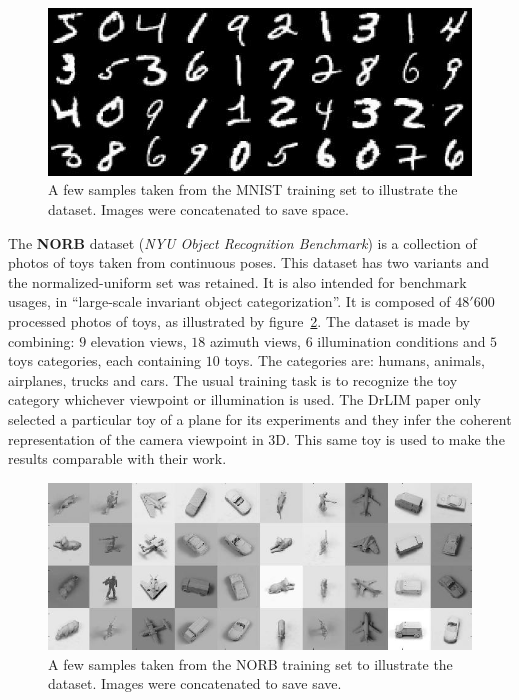 \documentclass[a4paper,12pt]{report}
\begin{document}
\begin{figure}[t]
    \begin{center}
        \includegraphics{thesis_figures/mnist.jpg}
    \end{center}
    \caption{A few samples taken from the MNIST training set to illustrate the dataset. Images were concatenated to save space.}
    \label{fig:mnist}
\end{figure}

The {\bf NORB} dataset ({\em NYU Object Recognition Benchmark}) is a collection of photos of toys taken from continuous poses.
This dataset has two variants and the normalized-uniform set was retained.
It is also intended for benchmark usages, in ``large-scale invariant object categorization''.
It is composed of $48'600$ processed photos of toys, as illustrated by figure~\ref{fig:norb}.
The dataset is made by combining: $9$ elevation views, $18$ azimuth views, $6$ illumination conditions and $5$ toys categories, each containing $10$ toys.
The categories are: humans, animals, airplanes, trucks and cars.
The usual training task is to recognize the toy category whichever viewpoint or illumination is used.
The DrLIM paper only selected a particular toy of a plane for its experiments and they infer the coherent representation of the camera viewpoint in 3D.
This same toy is used to make the results comparable with their work.

\begin{figure}[t]
    \begin{center}
        \includegraphics{thesis_figures/norb.jpg}
    \end{center}
    \caption{A few samples taken from the NORB training set to illustrate the dataset. Images were concatenated to save save.}
    \label{fig:norb}
\end{figure}
\end{document}

